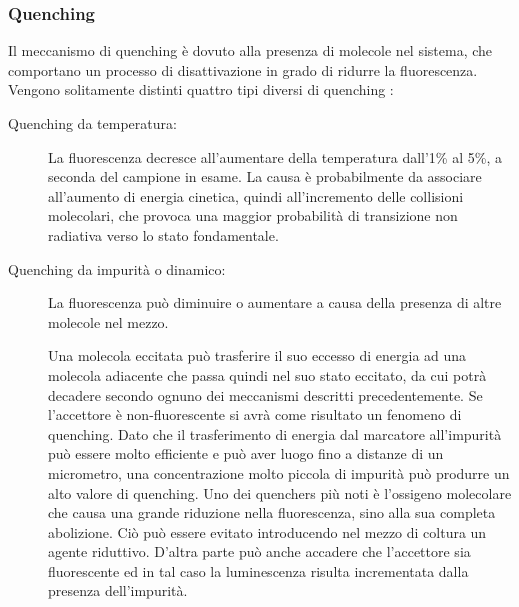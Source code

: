 \subsubsection*{Quenching}
Il meccanismo di quenching è dovuto alla presenza di molecole nel sistema, che comportano un processo di disattivazione in grado di ridurre la fluorescenza. Vengono solitamente distinti quattro tipi diversi di quenching \cite{quenching}:
\begin{description}
\item [Quenching da temperatura:]
La fluorescenza decresce all'aumentare della temperatura dall'1\% al 5\%, a seconda del campione in esame. 
La causa è probabilmente da associare all'aumento di energia cinetica, quindi all'incremento delle collisioni molecolari, che provoca una maggior probabilità di transizione non radiativa verso lo stato fondamentale.

\item [Quenching da impurità o dinamico:]
La fluorescenza può diminuire o aumentare a causa della presenza di altre molecole nel mezzo.

Una molecola eccitata può trasferire il suo eccesso di energia ad una molecola adiacente che passa quindi nel suo stato eccitato, da cui potrà decadere
secondo ognuno dei meccanismi descritti precedentemente. 
Se l'accettore è non-fluorescente si avrà come risultato un fenomeno di quenching. 
Dato che il trasferimento di energia dal marcatore all'impurità può essere molto efficiente e può aver luogo fino a distanze di un micrometro, una concentrazione molto piccola di impurità può produrre un alto valore di quenching. 
Uno dei quenchers più noti è l'ossigeno molecolare che causa una grande riduzione nella fluorescenza, sino alla sua completa abolizione. 
Ciò può essere evitato introducendo nel mezzo di coltura un agente riduttivo.
D'altra parte può anche accadere che l'accettore sia fluorescente ed in tal caso la luminescenza risulta incrementata dalla presenza dell'impurità.


\end{description}
